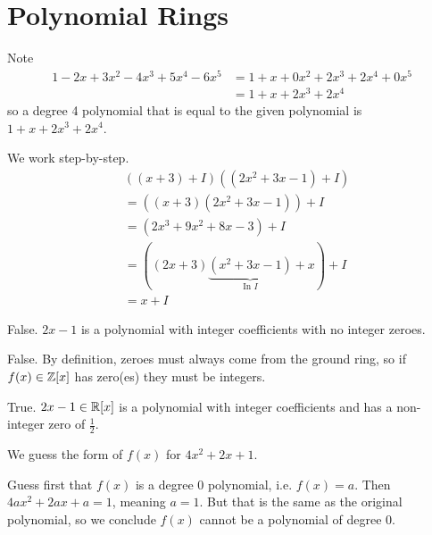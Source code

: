 \section{Polynomial Rings}
\begin{questions}
    \item Note
    \begin{align*}
        1 - 2x + 3x^2 - 4x^3 + 5x^4 - 6x^5 &= 1 + x + 0x^2 + 2x^3 + 2x^4 + 0x^5\\
        &= 1 + x + 2x^3 + 2x^4
    \end{align*}
    so a degree 4 polynomial that is equal to the given polynomial is $1 + x + 2x^3 + 2x^4$.

    \item We work step-by-step.
    \begin{align*}
        &\left((x + 3) + I\right)\left((2x^2 + 3x - 1) + I\right)\\
        &= \left((x + 3)(2x^2+3x-1)\right) + I\\
        &= \left(2x^3 + 9x^2 + 8x - 3\right) + I\\
        &= \left((2x+3)\underbrace{(x^2+3x-1)}_{\text{In }I} + x\right) + I\\
        &= x + I
    \end{align*}

    \item \begin{partquestions}{\alph*}
        \item False. $2x-1$ is a polynomial with integer coefficients with no integer zeroes.

        \item False. By definition, zeroes must always come from the ground ring, so if $f(x) \in \mathbb{Z}[x]$ has zero(es) they must be integers.

        \item True. $2x-1 \in \mathbb{R}[x]$ is a polynomial with integer coefficients and has a non-integer zero of $\frac12$.
    \end{partquestions}

    \item \begin{partquestions}{\alph*}
        \item We guess the form of $f(x)$ for $4x^2 + 2x + 1$.

        Guess first that $f(x)$ is a degree 0 polynomial, i.e. $f(x) = a$. Then $4ax^2 + 2ax + a = 1$, meaning $a = 1$. But that is the same as the original polynomial, so we conclude $f(x)$ cannot be a polynomial of degree 0.


\end{partquestions}
\end{questions}
